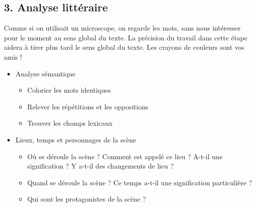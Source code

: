 \subsection*{3. Analyse littéraire}
Comme si on utilisait un microscope, on regarde les mots, sans nous intéresser pour le moment au sens global du texte. La précision du travail dans cette étape aidera à tirer plus tard le sens global du texte. Les crayons de couleurs sont vos amis !
\begin{itemize}[label=]
\item Analyse sémantique
\begin{itemize}[label=]
\item Colorier les mots identiques
\item Relever les répétitions et les oppositions
\item Trouver les champs lexicaux
\end{itemize}
\item Lieux, temps et personnages de la scène
\begin{itemize}[label=]
\item Où se déroule la scène ? Comment est appelé ce lieu ? A-t-il une signification ? Y a-t-il des changements de lieu ?
\item Quand se déroule la scène ? Ce temps a-t-il une signification particulière ?
\item Qui sont les protagonistes de la scène ? 
\end{itemize}
\end{itemize}
